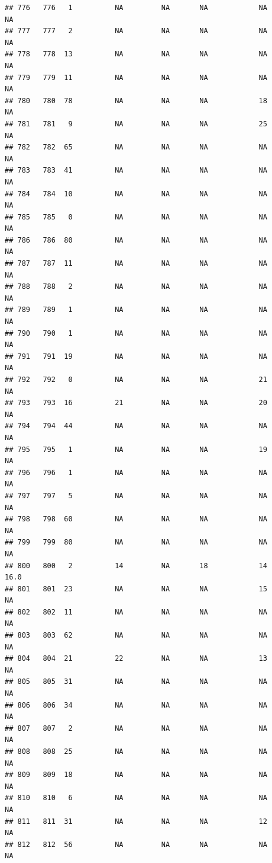 \documentclass[man]{apa6}
\begin{document}
\begin{verbatim}
## 776   776   1          NA         NA       NA            NA       NA
## 777   777   2          NA         NA       NA            NA       NA
## 778   778  13          NA         NA       NA            NA       NA
## 779   779  11          NA         NA       NA            NA       NA
## 780   780  78          NA         NA       NA            18       NA
## 781   781   9          NA         NA       NA            25       NA
## 782   782  65          NA         NA       NA            NA       NA
## 783   783  41          NA         NA       NA            NA       NA
## 784   784  10          NA         NA       NA            NA       NA
## 785   785   0          NA         NA       NA            NA       NA
## 786   786  80          NA         NA       NA            NA       NA
## 787   787  11          NA         NA       NA            NA       NA
## 788   788   2          NA         NA       NA            NA       NA
## 789   789   1          NA         NA       NA            NA       NA
## 790   790   1          NA         NA       NA            NA       NA
## 791   791  19          NA         NA       NA            NA       NA
## 792   792   0          NA         NA       NA            21       NA
## 793   793  16          21         NA       NA            20       NA
## 794   794  44          NA         NA       NA            NA       NA
## 795   795   1          NA         NA       NA            19       NA
## 796   796   1          NA         NA       NA            NA       NA
## 797   797   5          NA         NA       NA            NA       NA
## 798   798  60          NA         NA       NA            NA       NA
## 799   799  80          NA         NA       NA            NA       NA
## 800   800   2          14         NA       18            14     16.0
## 801   801  23          NA         NA       NA            15       NA
## 802   802  11          NA         NA       NA            NA       NA
## 803   803  62          NA         NA       NA            NA       NA
## 804   804  21          22         NA       NA            13       NA
## 805   805  31          NA         NA       NA            NA       NA
## 806   806  34          NA         NA       NA            NA       NA
## 807   807   2          NA         NA       NA            NA       NA
## 808   808  25          NA         NA       NA            NA       NA
## 809   809  18          NA         NA       NA            NA       NA
## 810   810   6          NA         NA       NA            NA       NA
## 811   811  31          NA         NA       NA            12       NA
## 812   812  56          NA         NA       NA            NA       NA

\end{verbatim}
\end{document}
